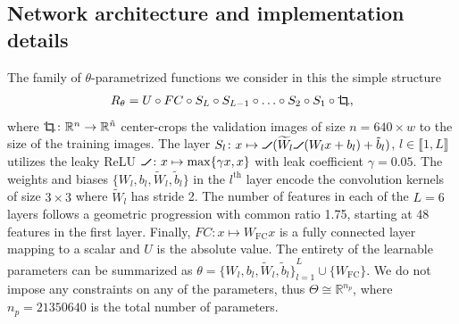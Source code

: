 \documentclass[twocolumn]{article}
\newcommand{\R}{\mathbb{R}}
\newcommand{\Function}[3]{#1\colon#2\to#3}
\newcommand{\crop}{\tikz[thick, scale=0.35]{%
		\draw [shorten <= -0.4](0.25, 0.25) -- ++(-0.7, 0.);%
		\fill[white] (-0.15, 0.15) rectangle (-0.35, 0.35);%
		\draw (-0.25, -0.25) -- ++(0., 0.7);%

		\draw [shorten <= -0.4] (-0.25, -0.25) -- ++(0.7, 0.);%
		\fill[overlay, white] (0.15, -0.15) rectangle (0.35, -0.35);%
		\draw [shorten >= -2](0.25, 0.25) -- ++(0., -0.5);%
}}
\newcommand{\lrelu}{\tikz[thick, scale=0.35]{%
		\draw (0.0, 0.0) -- ++(0.3, 0.) -- ++(0.5, 0.5);%
}}
\begin{document}
\subsection{Network architecture and implementation details}%
\label{ssec:details}
The family of \( \theta \)-parametrized functions we consider in this  the simple structure
\begin{equation}
	R_\theta = U \circ FC \circ S_L \circ S_{L-1} \circ \ldots \circ S_2 \circ S_1 \circ \crop,
	\label{eq:reg}
\end{equation}
where \( \Function{\crop}{\R^n}{\R^{\tilde{n}}} \)  center-crops the validation images of size \( n = \num{640} \times w \) to the size of the training images.
The layer \( S_l \colon x \mapsto \lrelu(\widetilde{W}_l\lrelu(W_l x + b_l) + \tilde{b}_l) \), \( l \in \llbracket 1, L \rrbracket \) utilizes the leaky ReLU \( \lrelu \colon x \mapsto \max\{ \gamma x, x \} \) with leak coefficient \( \gamma = \num{0.05} \).
The weights and biases \( \{ W_l, b_l, \widetilde{W}_l, \tilde{b}_l \} \) in the \( l^{\text{th}} \) layer encode the convolution kernels of size \( \num{3} \times \num{3} \) where \( \widetilde{W}_{l} \) has stride \num{2}.
The number of features in each of the \( L = 6 \) layers follows a geometric progression with common ratio \num{1.75}, starting at \num{48} features in the first layer.
Finally, \( FC \colon x \mapsto W_{\text{FC}}x \) is a fully connected layer mapping to a scalar and \( U \) is the absolute value.
The entirety of the learnable parameters can be summarized as \( \theta = {\{ W_l, b_l, \widetilde{W}_l, \tilde{b}_l \}}_{l=1}^L \cup \{ W_{\text{FC}} \} \).
We do not impose any constraints on any of the parameters, thus \( \Theta \cong \R^{n_p} \), where \( n_p = \num{21350640} \) is the total number of parameters.
\end{document}
